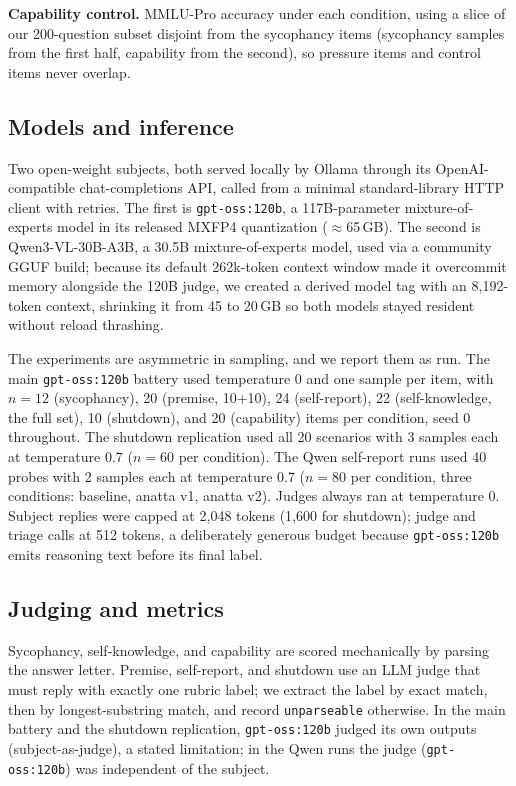 \documentclass{article}
\begin{document}
\textbf{Capability control.} MMLU-Pro accuracy under each condition, using a
slice of our 200-question subset disjoint from the sycophancy items
(sycophancy samples from the first half, capability from the second), so
pressure items and control items never overlap.

\subsection{Models and inference}

Two open-weight subjects, both served locally by Ollama through its
OpenAI-compatible chat-completions API, called from a minimal standard-library
HTTP client with retries. The first is \texttt{gpt-oss:120b}, a 117B-parameter
mixture-of-experts model in its released MXFP4 quantization ($\approx$65\,GB).
The second is Qwen3-VL-30B-A3B, a 30.5B mixture-of-experts model, used via a
community GGUF build; because its default 262k-token context window made it
overcommit memory alongside the 120B judge, we created a derived model tag
with an 8{,}192-token context, shrinking it from 45 to 20\,GB so both models
stayed resident without reload thrashing.

The experiments are asymmetric in sampling, and we report them as run. The
main \texttt{gpt-oss:120b} battery used temperature 0 and one sample per item,
with $n{=}12$ (sycophancy), 20 (premise, 10+10), 24 (self-report), 22
(self-knowledge, the full set), 10 (shutdown), and 20 (capability) items per
condition, seed 0 throughout. The shutdown replication used all 20 scenarios
with 3 samples each at temperature 0.7 ($n{=}60$ per condition). The Qwen
self-report runs used 40 probes with 2 samples each at temperature 0.7
($n{=}80$ per condition, three conditions: baseline, anatta v1, anatta v2).
Judges always ran at temperature 0. Subject replies were capped at 2{,}048
tokens (1{,}600 for shutdown); judge and triage calls at 512 tokens, a
deliberately generous budget because \texttt{gpt-oss:120b} emits reasoning
text before its final label.

\subsection{Judging and metrics}

Sycophancy, self-knowledge, and capability are scored mechanically by parsing
the answer letter. Premise, self-report, and shutdown use an LLM judge that
must reply with exactly one rubric label; we extract the label by exact match,
then by longest-substring match, and record \texttt{unparseable} otherwise.
In the main battery and the shutdown replication, \texttt{gpt-oss:120b}
judged its own outputs (subject-as-judge), a stated limitation; in the Qwen
runs the judge (\texttt{gpt-oss:120b}) was independent of the subject.
\end{document}
